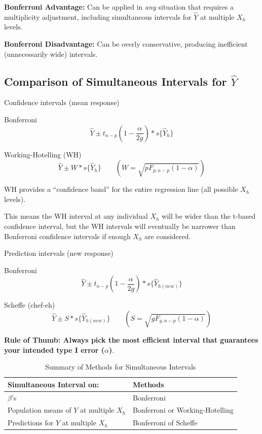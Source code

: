 \documentclass[12pt]{../notes}
\begin{document}
\nspace
\bi
\item \textbf{Bonferroni Advantage:} Can be applied in \textit{any} situation that requires a multiplicity adjustment, including simultaneous intervals for $\hat{Y}$ at multiple $X_h$ levels. 
\item \textbf{Bonferroni Disadvantage:} Can be overly conservative, producing inefficient (unnecessarily wide) intervals. 
\ei

\subsection*{Comparison of Simultaneous Intervals for $\hat{Y}$}
\bi
\item Confidence intervals (mean response)
\bi
\item Bonferroni
\[
\hat{Y} \pm t_{n-p}(1-\frac{\alpha}{2g})*s\{\hat{Y}_h\}
\]
\item Working-Hotelling (WH)
\[
\hat{Y} \pm W*s\{\hat{Y}_h\} \qquad \left(W = \sqrt{pF_{p, n-p}(1-\alpha)}\right)
\]

\begin{minipage}[l][2cm][c]{\textwidth}
\end{minipage}

\bi
\item WH provides a ``confidence band'' for the entire regression line (all possible $X_h$ levels). 
\item This means the WH interval at any individual $X_h$ will be wider than the t-based confidence interval, but the WH intervals will eventually be narrower than Bonferroni confidence intervals if enough $X_h$ are considered. 
\ei
\ei

\item Prediction intervals (new response)

\bi
\item Bonferroni
\[
\hat{Y} \pm t_{n-p}(1-\frac{\alpha}{2g})*s\{\hat{Y}_{h (new)}\}
\]
\item Scheffe (chef-eh)
\[
\hat{Y} \pm S*s\{\hat{Y}_{h (new)}\} \qquad \left(S = \sqrt{gF_{g, n-p}(1-\alpha)}\right)
\]
\ei
\ei

\textbf{Rule of Thumb: Always pick the most efficient interval that guarantees your intended type I error ($\alpha$)}. 

\nspace

\begin{table}[H]
\centering
\caption{Summary of Methods for Simultaneous Intervals}
\begin{tabular}{|l|l|}
\hline
\textbf{Simultaneous Interval on:} & \textbf{Methods} \\ \hline
$\beta$'s & Bonferroni \\ \hline
Population means of $Y$ at multiple $X_h$ & Bonferroni or Working-Hotelling \\ \hline
Predictions for $Y$ at multiple $X_h$ & Bonferroni of Scheffe \\ \hline
\end{tabular}
\end{table}
\end{document}
